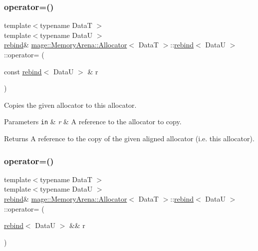 \subsubsection{\texorpdfstring{operator=()}{operator=()}\hspace{0.1cm}{\footnotesize\ttfamily [1/2]}}
{\footnotesize\ttfamily template$<$typename DataT $>$ \\
template$<$typename DataU $>$ \\
\hyperlink{structmage_1_1_memory_arena_1_1_allocator_1_1rebind}{rebind}\& \hyperlink{structmage_1_1_memory_arena_1_1_allocator}{mage\+::\+Memory\+Arena\+::\+Allocator}$<$ DataT $>$\+::\hyperlink{structmage_1_1_memory_arena_1_1_allocator_1_1rebind}{rebind}$<$ DataU $>$\+::operator= (\begin{DoxyParamCaption}\item[{const \hyperlink{structmage_1_1_memory_arena_1_1_allocator_1_1rebind}{rebind}$<$ DataU $>$ \&}]{r }\end{DoxyParamCaption})\hspace{0.3cm}{\ttfamily [delete]}}

Copies the given allocator to this allocator.


\begin{DoxyParams}[1]{Parameters}
\mbox{\tt in}  & {\em r} & A reference to the allocator to copy. \\
\hline
\end{DoxyParams}
\begin{DoxyReturn}{Returns}
A reference to the copy of the given aligned allocator (i.\+e. this allocator). 
\end{DoxyReturn}
\hypertarget{structmage_1_1_memory_arena_1_1_allocator_1_1rebind_a3c0ea6bf80d7b64144021d710d6c1b01}{}\label{structmage_1_1_memory_arena_1_1_allocator_1_1rebind_a3c0ea6bf80d7b64144021d710d6c1b01} 
\subsubsection{\texorpdfstring{operator=()}{operator=()}\hspace{0.1cm}{\footnotesize\ttfamily [2/2]}}
{\footnotesize\ttfamily template$<$typename DataT $>$ \\
template$<$typename DataU $>$ \\
\hyperlink{structmage_1_1_memory_arena_1_1_allocator_1_1rebind}{rebind}\& \hyperlink{structmage_1_1_memory_arena_1_1_allocator}{mage\+::\+Memory\+Arena\+::\+Allocator}$<$ DataT $>$\+::\hyperlink{structmage_1_1_memory_arena_1_1_allocator_1_1rebind}{rebind}$<$ DataU $>$\+::operator= (\begin{DoxyParamCaption}\item[{\hyperlink{structmage_1_1_memory_arena_1_1_allocator_1_1rebind}{rebind}$<$ DataU $>$ \&\&}]{r }\end{DoxyParamCaption})\hspace{0.3cm}{\ttfamily [delete]}}

